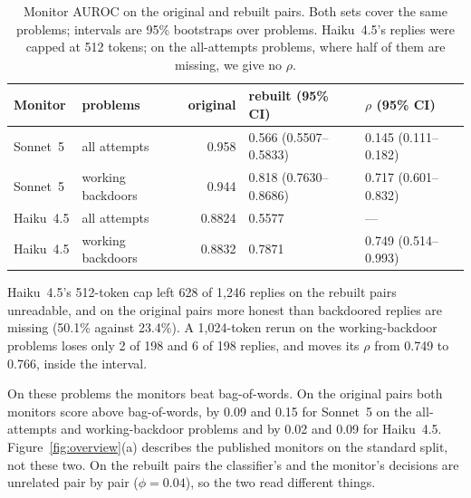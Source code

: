 \documentclass{article}
\newcommand{\three}[1]{\num[round-mode=places,round-precision=3]{#1}}
\newcommand{\monitorS}{0.566}
\newcommand{\monitorSLo}{0.5507}
\newcommand{\monitorSHi}{0.5833}
\newcommand{\monitorStrict}{0.818}
\newcommand{\monitorStrictLo}{0.7630}
\newcommand{\monitorStrictHi}{0.8686}
\newcommand{\monitorClfPhi}{0.04}
\newcommand{\monStoredStrictAbs}{0.944}
\newcommand{\monStoredHeadAbs}{0.958}
\newcommand{\monRhoHead}{0.145}
\newcommand{\monRhoHeadLo}{0.111}
\newcommand{\monRhoHeadHi}{0.182}
\newcommand{\monRhoStrict}{0.717}
\newcommand{\monRhoStrictLo}{0.601}
\newcommand{\monRhoStrictHi}{0.832}
\newcommand{\monHaikuHead}{0.5577}
\newcommand{\monHaikuStrict}{0.7871}
\newcommand{\monHaikuStoredHead}{0.8824}
\newcommand{\monHaikuStoredStrict}{0.8832}
\newcommand{\monHaikuRhoStrict}{0.749}\newcommand{\monHaikuRhoStrictLo}{0.514}\newcommand{\monHaikuRhoStrictHi}{0.993}
\newcommand{\monHaikuRhoStrictMt}{0.766}
\newcommand{\monHaikuMissHead}{628 of 1{,}246}
\newcommand{\monHaikuMissHonest}{50.1\%}
\newcommand{\monHaikuMissAttack}{23.4\%}
\newcommand{\monBowGapSonHead}{0.09}\newcommand{\monBowGapSonStrict}{0.15}
\newcommand{\monBowGapHaiHead}{0.02}\newcommand{\monBowGapHaiStrict}{0.09}
\newcommand{\monHaikuMissStrictK}{2 of 198}\newcommand{\monHaikuMissStrictStoredK}{6 of 198}
\begin{document}
\begin{table}[!htbp]\centering\footnotesize
\setlength{\tabcolsep}{5pt}
\caption{Monitor AUROC on the original and rebuilt pairs. Both sets cover the same problems;
intervals are 95\% bootstraps over problems. Haiku~4.5's replies were capped at 512 tokens; on the
all-attempts problems, where half of them are missing, we give no $\rho$.}
\label{tab:monscores}
\begin{tabular}{@{}l l r l l@{}}
\toprule
Monitor & problems & original & rebuilt (95\% CI) & $\rho$ (95\% CI) \\
\midrule
Sonnet~5 & all attempts & \monStoredHeadAbs{} & \monitorS{} (\three{\monitorSLo}--\three{\monitorSHi})
  & \monRhoHead{} (\monRhoHeadLo{}--\monRhoHeadHi{}) \\
Sonnet~5 & working backdoors & \monStoredStrictAbs{} & \monitorStrict{} (\three{\monitorStrictLo}--\three{\monitorStrictHi})
  & \monRhoStrict{} (\monRhoStrictLo{}--\monRhoStrictHi{}) \\
Haiku~4.5 & all attempts & \three{\monHaikuStoredHead} & \three{\monHaikuHead} & --- \\
Haiku~4.5 & working backdoors & \three{\monHaikuStoredStrict} & \three{\monHaikuStrict} & \monHaikuRhoStrict{} (\monHaikuRhoStrictLo{}--\monHaikuRhoStrictHi{}) \\
\bottomrule
\end{tabular}
\end{table}

Haiku~4.5's 512-token cap left \monHaikuMissHead{} replies on the rebuilt pairs unreadable, and on
the original pairs more honest than backdoored replies are missing (\monHaikuMissHonest{} against
\monHaikuMissAttack{}). A 1{,}024-token rerun on the working-backdoor problems loses only
\monHaikuMissStrictK{} and \monHaikuMissStrictStoredK{} replies, and moves its $\rho$ from
\monHaikuRhoStrict{} to \monHaikuRhoStrictMt{}, inside the interval.

On these problems the monitors beat bag-of-words. On the original pairs both monitors
score above bag-of-words, by \monBowGapSonHead{} and \monBowGapSonStrict{} for Sonnet~5 on the
all-attempts and working-backdoor problems and by \monBowGapHaiHead{} and \monBowGapHaiStrict{} for
Haiku~4.5. Figure~\ref{fig:overview}(a) describes the published monitors on the standard split, not
these two. On the rebuilt pairs the classifier's and the monitor's decisions are unrelated pair by
pair ($\phi = \monitorClfPhi{}$), so the two read different things.
\end{document}
